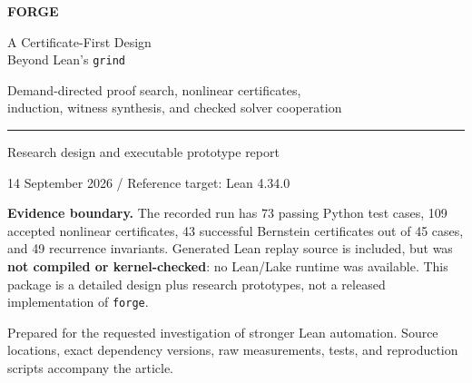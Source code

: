 \documentclass[11pt,a4paper]{article}
\newcommand{\grind}{\texttt{grind}}
\newcommand{\forge}{\texttt{forge}}
\begin{document}
\begin{titlepage}
\vspace*{14mm}
{\sffamily\bfseries\color{ForgeBlue}\fontsize{42}{46}\selectfont FORGE\par}
\vspace{5mm}
{\sffamily\LARGE A Certificate-First Design\\[2mm]Beyond Lean's \texttt{grind}\par}
\vspace{8mm}
{\large Demand-directed proof search, nonlinear certificates,\\
induction, witness synthesis, and checked solver cooperation\par}
\vspace{10mm}
\textcolor{ForgeBlue}{\rule{\textwidth}{0.7pt}}
\vspace{3mm}
{\sffamily\large Research design and executable prototype report\par}
{14 September 2026 \quad / \quad Reference target: Lean 4.34.0\par}
\vspace{7mm}
\begin{abstract}
\noindent
A tactic substantially broader than \grind\ should not replace its congruence
closure with another e-graph, nor merely run a longer list of existing tactics.
It should retain \grind\ as a strong local engine while discovering the missing
intermediate facts, structural arguments, witnesses, and nonlinear certificates
that make local reasoning succeed. This report specifies \emph{Forge}, a typed,
scope-aware, certificate-first architecture for that purpose. Four research
prototypes are implemented and tested: demand-directed Horn inference, sparse
polynomial-cone search, Bernstein positivity certificates, and polynomial
recurrence invariants. They demonstrate concrete mechanisms, including their
failure modes, but do not establish superiority over the actual Lean tactic.
The proposed Lean integration has not been implemented or benchmarked.
\end{abstract}
\vspace{5mm}
\begin{statusbox}
\textbf{Evidence boundary.} The recorded run has 73 passing Python test cases,
109 accepted nonlinear certificates, 43 successful Bernstein certificates out
of 45 cases, and 49 recurrence invariants. Generated Lean replay source is
included, but was \textbf{not compiled or kernel-checked}: no Lean/Lake runtime
was available. This package is a detailed design plus research prototypes,
not a released implementation of \forge.
\end{statusbox}
\vfill
{\small Prepared for the requested investigation of stronger Lean automation.
Source locations, exact dependency versions, raw measurements, tests, and
reproduction scripts accompany the article.}
\end{titlepage}
\setcounter{page}{2}
{\setlength{\parskip}{0pt}\small\tableofcontents}
\clearpage






\clearpage
{}

\end{document}
